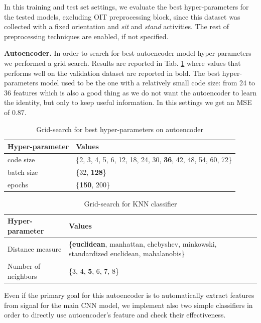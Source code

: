 In this training and test set settings, we evaluate the best
hyper-parameters for the tested models, excluding OIT
preprocessing block, since this dataset was collected with a fixed
orientation and \textit{sit} and \textit{stand} activities. The rest
of preprocessing techniques are enabled, if not specified.

\textbf{Autoencoder.} In order to search for best autoencoder model
hyper-parameters we performed a grid search. Results are reported in
Tab. \ref{tab:ae-hyperparams} where values that performs well on the
validation dataset are reported in bold. The best hyper-parameters
model used to be the one with a relatively small code size: from 24 to
36 features which is also a good thing as we do not want the
autoencoder to learn the identity, but only to keep useful
information. In this settings we get an MSE of $0.87$.

\begin{table}[t]
  \centering
  \begin{tabular}{lp{4cm}}
    \hline
    Hyper-parameter & Values \\
    \hline
    code size & \{2, 3, 4, 5, 6, 12, 18, 24, 30, \textbf{36}, 42, 48, 54, 60, 72\} \\
    batch size & \{32, \textbf{128}\} \\
    epochs & \{\textbf{150}, 200\} \\
    \hline
  \end{tabular}
  \caption{Grid-search for best hyper-parameters on autoencoder}
  \label{tab:ae-hyperparams}
\end{table}

\begin{table}[b]
	\centering
	\begin{tabular}{p{2.4cm}p{4.5cm}}
		\hline
		Hyper-parameter & Values \\
		\hline
		Distance measure & \{\textbf{euclidean}, manhattan, chebyshev, minkowski, standardized euclidean, mahalanobis\} \\
		Number of neighbors & \{3, 4, \textbf{5}, 6, 7, 8\} \\
		\hline
	\end{tabular}
	\caption{Grid-search for KNN classifier}
	\label{tab:knn-grid-search}
\end{table}

Even if the primary goal for this autoencoder is to automatically
extract features from signal for the main CNN model, we implement also
two simple classifiers in order to directly use autoencoder's feature
and check their effectiveness.

